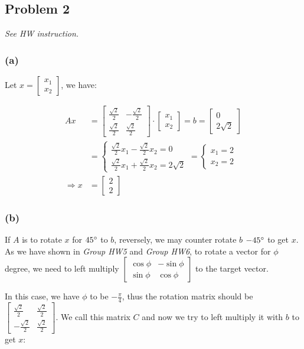 \documentclass[11pt]{article}
\providecommand{\qbm}[1]{\begin{bmatrix} #1 \end{bmatrix}}
\begin{document}
\subsection*{Problem 2}
\textit{See HW instruction.}\newline

\subsubsection*{(a)}

Let $x = \qbm{x_1 \\ x_2}$, we have:

\begin{align*}
    Ax &= \qbm{\frac{\sqrt{2}}{2} & -\frac{\sqrt{2}}{2} \\ \frac{\sqrt{2}}{2} & \frac{\sqrt{2}}{2}} \cdot \qbm{x_1 \\ x_2} = b = \qbm{0 \\ 2 \sqrt{2}} \\
    &= \begin{cases}
        \frac{\sqrt{2}}{2} x_1 -\frac{\sqrt{2}}{2} x_2 = 0 \\
        \frac{\sqrt{2}}{2} x_1 +\frac{\sqrt{2}}{2} x_2 = 2 \sqrt{2}
    \end{cases} = \begin{cases}
        x_1 = 2 \\
        x_2 = 2
    \end{cases} \\
    \Longrightarrow x &= \qbm{2 \\ 2}
\end{align*}

\subsubsection*{(b)}
If $A$ is to rotate $x$ for $45 \degree$ to $b$, reversely, we may counter rotate $b$ $-45 \degree$ to get $x$. As we have shown in \textit{Group HW5} and \textit{Group HW6}, to rotate a vector for $\phi$ degree, we need to left multiply $\qbm{\cos \phi & -\sin \phi \\ \sin \phi & \cos \phi}$ to the target vector.

In this case, we have $\phi$ to be $-\frac{\pi}{4}$, thus the rotation matrix should be $\qbm{\frac{\sqrt{2}}{2} & \frac{\sqrt{2}}{2} \\ -\frac{\sqrt{2}}{2} & \frac{\sqrt{2}}{2}}$. We call this matrix $C$ and now we try to left multiply it with $b$ to get $x$:
\end{document}
